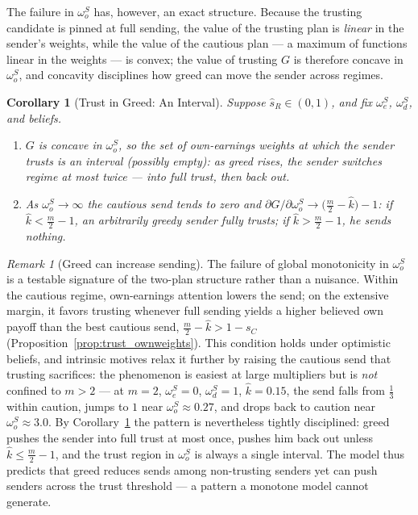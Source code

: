 \documentclass[11pt]{article}
\theoremstyle{plain}
\newtheorem{corollary}{Corollary}
\theoremstyle{remark}
\newtheorem{remark}{Remark}
\begin{document}
The failure in $\omega_o^S$ has, however, an exact structure.  Because the trusting candidate is pinned at full sending, the value of the trusting plan is \emph{linear} in the sender's weights, while the value of the cautious plan --- a maximum of functions linear in the weights --- is convex; the value of trusting $G$ is therefore concave in $\omega_o^S$, and concavity disciplines how greed can move the sender across regimes.

\begin{corollary}[Trust in Greed: An Interval]
\label{cor:greed_interval}
Suppose $\hat s_R\in(0,1)$, and fix $\omega_e^S$, $\omega_d^S$, and beliefs.
\begin{enumerate}[topsep=2pt,itemsep=2pt]
\item $G$ is concave in $\omega_o^S$, so the set of own-earnings weights at which the sender trusts is an interval (possibly empty): as greed rises, the sender switches regime at most twice --- into full trust, then back out.
\item As $\omega_o^S\to\infty$ the cautious send tends to zero and $\partial G/\partial\omega_o^S\to\big(\tfrac m2-\hat k\big)-1$: if $\hat k<\tfrac m2-1$, an arbitrarily greedy sender fully trusts; if $\hat k>\tfrac m2-1$, he sends nothing.
\end{enumerate}
\end{corollary}

\begin{remark}[Greed can increase sending]
The failure of global monotonicity in $\omega_o^S$ is a testable signature of the two-plan structure rather than a nuisance.  Within the cautious regime, own-earnings attention lowers the send; on the extensive margin, it favors trusting whenever full sending yields a higher believed own payoff than the best cautious send, $\tfrac m2-\hat k>1-s_C$ (Proposition~\ref{prop:trust_ownweights}).  This condition holds under optimistic beliefs, and intrinsic motives relax it further by raising the cautious send that trusting sacrifices: the phenomenon is easiest at large multipliers but is \emph{not} confined to $m>2$ --- at $m=2$, $\omega_e^S=0$, $\omega_d^S=1$, $\hat k=0.15$, the send falls from $\tfrac13$ within caution, jumps to $1$ near $\omega_o^S\approx0.27$, and drops back to caution near $\omega_o^S\approx3.0$.  By Corollary~\ref{cor:greed_interval} the pattern is nevertheless tightly disciplined: greed pushes the sender into full trust at most once, pushes him back out unless $\hat k\le\tfrac m2-1$, and the trust region in $\omega_o^S$ is always a single interval.  The model thus predicts that greed reduces sends among non-trusting senders yet can push senders across the trust threshold --- a pattern a monotone model cannot generate.
\end{remark}
\end{document}

